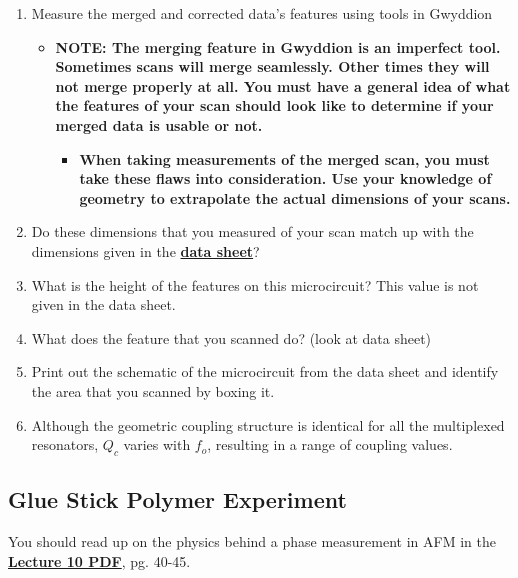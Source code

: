 \documentclass{../lab}
\begin{document}
\begin{enumerate}
    \item Measure the merged and corrected data's features using tools in Gwyddion

    \begin{itemize}
        \item \textbf{NOTE: The merging feature in Gwyddion is an imperfect tool.  Sometimes scans will merge seamlessly. Other times they will not merge properly at all. You must have a general idea of what the features of your scan should look like to determine if your merged data is usable or not.}
        \begin{itemize}
            \item \textbf{When taking measurements of the merged scan, you must take these flaws into consideration.  Use your knowledge of geometry to extrapolate the actual dimensions of your scans.}
        \end{itemize}

    \end{itemize}

    \item Do these dimensions that you measured of your scan match up with the dimensions given in the \href{http://experimentationlab.berkeley.edu/sites/default/files/AFMImages/CSQ\_Resonators\_1July2011\%20.pdf}{\textbf{data sheet}}?

    \item What is the height of the features on this microcircuit?  This value is not given in the data sheet.

    \item What does the feature that you scanned do? (look at data sheet)

    \item Print out the schematic of the microcircuit from the data sheet and identify the area that you scanned by boxing it.

    \item Although the geometric coupling structure is identical for all the multiplexed resonators, $Q_c$ varies with $f_o$, resulting in a range of coupling values.

\end{enumerate}

\subsection{Glue Stick Polymer Experiment}
\label{subsec:GlueStick}

You should read up on the physics behind a phase measurement in AFM in the \href{http://experimentationlab.berkeley.edu/sites/default/files/AFMImages/Lecture\_10\_AFM.pdf}{\textbf{Lecture 10 PDF}}, pg. 40-45.
\end{document}

